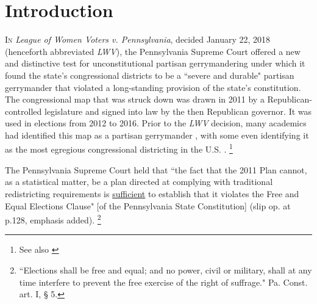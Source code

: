 \section{Introduction}
    \lettrine[lines=3, lraise=0.1, nindent=0em]{\color{lightgray}I}{n} \textit{League of Women Voters v. Pennsylvania}, decided January 22, 2018 (henceforth abbreviated \textit{LWV}), the Pennsylvania Supreme Court offered a new and distinctive test for unconstitutional partisan gerrymandering under which it found the state’s congressional districts to be a ``severe and durable" partisan gerrymander that violated a long-standing provision of the state’s constitution. The congressional map that was struck down was drawn in 2011 by a Republican-controlled legislature and signed into law by the then Republican governor. It was used in elections from 2012 to 2016. Prior to the \textit{LWV} decision, many academics had identified this map as a partisan gerrymander \citep[see e.g.,][]{Royden2017}, with some even identifying it as the most egregious congressional districting in the U.S. \citep[][ esp. Figure 3]{Wang2016_SLR}.
        \footnote{See also \citet{Mcgann_et_al_2015_ELJ, McGann_et_al_2016_gerrymandering}}
\par
    The Pennsylvania Supreme Court held that ``the fact that the 2011 Plan cannot, as a statistical matter, be a plan directed at complying with traditional redistricting requirements is \underline{sufficient} to establish that it violates the Free and Equal Elections Clause" [of the Pennsylvania State Constitution] (slip op. at p.128, emphasis added).
        \footnote{``Elections shall be free and equal; and no power, civil or military, shall at any time interfere to prevent the free exercise of the right of suffrage." Pa. Const. art. I, § 5.}
